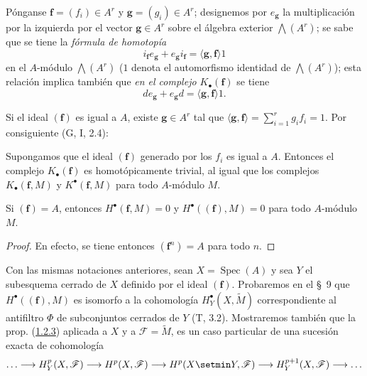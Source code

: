 \begin{env}[1.1.7]
\label{III.1.1.7}
\label{III.1.1.7-fr}
Pónganse $\mathbf f=(f_i)\in A^r$ y $\mathbf g=(g_i)\in A^r$; designemos por $e_{\mathbf g}$ la multiplicación por la izquierda por el vector $\mathbf g\in A^r$ sobre el álgebra exterior $\bigwedge(A^r)$; se sabe que se tiene la \emph{fórmula de homotopía}
\begin{equation}
\label{III.1.1.7.1-fr}
\tag{1.1.7.1}
i_{\mathbf f}e_{\mathbf g}+e_{\mathbf g}i_{\mathbf f}
=\langle\mathbf g,\mathbf f\rangle 1
\end{equation}
en el $A$-módulo $\bigwedge(A^r)$ ($1$ denota el automorfismo identidad de $\bigwedge(A^r)$); esta relación implica también que \emph{en el complejo $K_\bullet(\mathbf f)$} se tiene
\begin{equation}
\label{III.1.1.7.2-fr}
\tag{1.1.7.2}
de_{\mathbf g}+e_{\mathbf g}d=\langle\mathbf g,\mathbf f\rangle 1.
\end{equation}

Si el ideal $(\mathbf f)$ es igual a $A$, existe $\mathbf g\in A^r$ tal que $\langle\mathbf g,\mathbf f\rangle=\sum_{i=1}^r g_if_i=1$.
Por consiguiente (G, I, 2.4):
\end{env}

\begin{proposition}[1.1.8]
\label{III.1.1.8}
\label{III.1.1.8-fr}
Supongamos que el ideal $(\mathbf f)$ generado por los $f_i$ es igual a $A$.
Entonces el complejo $K_\bullet(\mathbf f)$ es homotópicamente trivial, al igual que los complejos $K_\bullet(\mathbf f,M)$ y $K^\bullet(\mathbf f,M)$ para todo $A$-módulo $M$.
\end{proposition}

\begin{corollary}[1.1.9]
\label{III.1.1.9}
\label{III.1.1.9-fr}
Si $(\mathbf f)=A$, entonces $H^\bullet(\mathbf f,M)=0$ y $H^\bullet((\mathbf f),M)=0$ para todo $A$-módulo $M$.
\end{corollary}

\begin{proof}
En efecto, se tiene entonces $(\mathbf f^n)=A$ para todo $n$.
\end{proof}

\begin{remark}[1.1.10]
\label{III.1.1.10}
\label{III.1.1.10-fr}
Con las mismas notaciones anteriores, sean $X=\operatorname{Spec}(A)$ y sea $Y$ el subesquema cerrado de $X$ definido por el ideal $(\mathbf f)$. Probaremos en el \S~9 que $H^\bullet((\mathbf f),M)$ es isomorfo a la cohomología $H_Y^\bullet(X,\widetilde M)$ correspondiente al antifiltro $\Phi$ de subconjuntos cerrados de $Y$ (T, 3.2). Mostraremos también que la prop. (\hyperref[III.1.2.3-fr]{1.2.3}) aplicada a $X$ y a $\mathcal F=\widetilde M$, es un caso particular de una sucesión exacta de cohomología
\[
\ldots\longrightarrow H_Y^p(X,\mathcal F)\longrightarrow H^p(X,\mathcal F)
\longrightarrow H^p(X\setmin Y,\mathcal F)\longrightarrow H_Y^{p+1}(X,\mathcal F)
\longrightarrow\ldots
\]
\end{remark}

